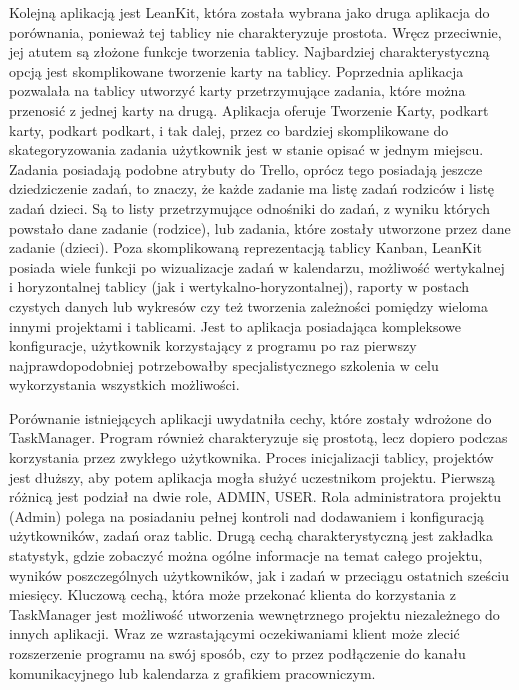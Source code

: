 \indent  Kolejną aplikacją jest LeanKit, która została wybrana jako druga aplikacja do porównania, ponieważ tej tablicy nie charakteryzuje prostota. Wręcz przeciwnie, jej atutem są złożone funkcje tworzenia tablicy. Najbardziej charakterystyczną opcją jest skomplikowane tworzenie karty na tablicy. Poprzednia aplikacja pozwalała na tablicy utworzyć karty przetrzymujące zadania, które można przenosić z jednej karty na drugą. Aplikacja oferuje Tworzenie Karty, podkart karty, podkart podkart, i tak dalej, przez co bardziej skomplikowane do skategoryzowania zadania użytkownik jest w stanie opisać w jednym miejscu. Zadania posiadają podobne atrybuty do Trello, oprócz tego posiadają jeszcze dziedziczenie zadań, to znaczy, że każde zadanie ma listę zadań rodziców i listę zadań dzieci. Są to listy przetrzymujące odnośniki do zadań, z wyniku których powstało dane zadanie (rodzice), lub zadania, które zostały utworzone przez dane zadanie (dzieci). 
Poza skomplikowaną reprezentacją tablicy Kanban, LeanKit posiada wiele funkcji po wizualizacje zadań w kalendarzu, możliwość wertykalnej i horyzontalnej tablicy (jak i wertykalno-horyzontalnej), raporty w postach czystych danych lub wykresów czy też tworzenia zależności pomiędzy wieloma innymi projektami i tablicami.
Jest to aplikacja posiadająca kompleksowe konfiguracje, użytkownik korzystający z programu po raz pierwszy najprawdopodobniej potrzebowałby specjalistycznego szkolenia w celu wykorzystania wszystkich możliwości.


\indent Porównanie istniejących aplikacji uwydatniła cechy, które zostały wdrożone do TaskManager. Program również charakteryzuje się prostotą, lecz dopiero podczas korzystania przez zwykłego użytkownika. Proces inicjalizacji tablicy, projektów jest dłuższy, aby potem aplikacja mogła służyć uczestnikom projektu.
Pierwszą różnicą jest podział na dwie role, ADMIN, USER. Rola administratora projektu (Admin) polega na posiadaniu pełnej kontroli nad dodawaniem i konfiguracją użytkowników, zadań oraz tablic.
Drugą cechą charakterystyczną jest zakładka statystyk, gdzie zobaczyć można ogólne informacje na temat całego projektu, wyników poszczególnych użytkowników, jak i zadań w przeciągu ostatnich sześciu miesięcy.
Kluczową cechą, która może przekonać klienta do korzystania z TaskManager jest możliwość utworzenia wewnętrznego projektu niezależnego do innych aplikacji. Wraz ze wzrastającymi oczekiwaniami klient może zlecić rozszerzenie programu na swój sposób, czy to przez podłączenie do kanału komunikacyjnego lub kalendarza z grafikiem pracowniczym.






